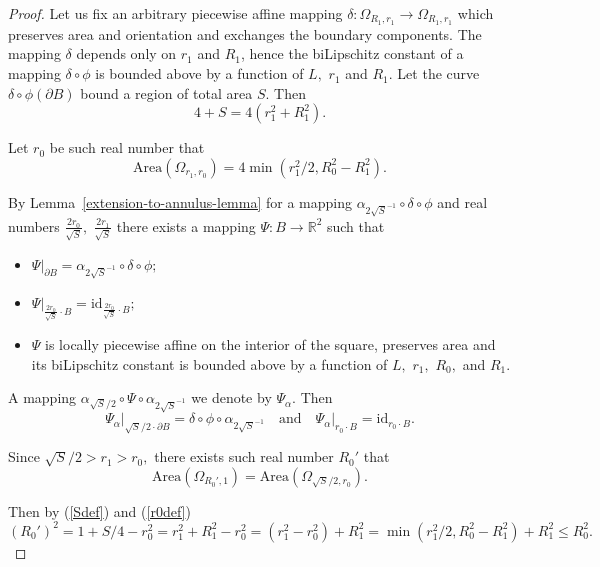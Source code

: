 \documentclass[12pt]{article}
\theoremstyle{definition}
\begin{document}
\begin{proof}
Let us fix an arbitrary piecewise affine mapping $\delta: \Omega_{R_1,r_1} \to \Omega_{R_1,r_1}$ which preserves area and orientation and exchanges the boundary components. The mapping $\delta$ depends only on $r_1$ and $R_1$, hence the biLipschitz constant of a mapping $\delta\circ\phi$ is bounded above by a function of $L,$ $r_1$ and $R_1.$ Let the curve $\delta\circ\phi(\partial B)$ bound a region of total area $S$. Then
\begin{equation}
\label{Sdef}
4 + S = 4\left(r_1^2 + R_1^2\right).
\end{equation}

Let $r_0$ be such real number that
\begin{equation}
\label{r0def}
\mathrm{Area}(\Omega_{r_1,r_0}) = 4\min\left(r_1^2/2, R_0^2 - R_1^2\right).
\end{equation}

By Lemma~\ref{extension-to-annulus-lemma} for a mapping $\alpha_{2\sqrt{S}^{-1}}\circ\delta\circ\phi$ and real numbers $\frac{2r_0}{\sqrt{S}},$ $\frac{2r_1}{\sqrt{S}}$ there exists a mapping $\Psi: B\to\mathbb R^2$ such that
\begin{itemize}
\item $\Psi\big|_{\partial B} = \alpha_{2\sqrt{S}^{-1}}\circ\delta\circ\phi;$
\item $\Psi\big|_{\frac{2r_0}{\sqrt{S}}\cdot B} = \mathrm{id}_{\frac{2r_0}{\sqrt{S}}\cdot B};$
\item $\Psi$ is locally piecewise affine on the interior of the square, preserves area and its biLipschitz constant is bounded above by a function of $L,$ $r_1,$ $R_0,$ and $R_1.$
\end{itemize}

A mapping $\alpha_{\sqrt{S}/2}\circ\Psi\circ\alpha_{2\sqrt{S}^{-1}}$ we denote by $\Psi_{\alpha}.$ Then
$$\Psi_{\alpha}\big|_{\sqrt{S}/2\cdot\partial B} = \delta\circ\phi\circ\alpha_{2\sqrt{S}^{-1}}
\quad\text{and}\quad
\Psi_{\alpha}\big|_{r_0\cdot B} = \mathrm{id}_{r_0\cdot B}.
$$

Since $\sqrt{S}/2 > r_1 > r_0,$ there exists such real number $R_0'$ that
$$\mathrm{Area}(\Omega_{R_0', 1}) = \mathrm{Area}(\Omega_{\sqrt {S}/2, r_0}).$$

Then by (\ref{Sdef}) and (\ref{r0def})
\begin{equation}
\label{R0prime}
\left(R_0'\right)^2 = 1 + S/4 - r_0^2 = r_1^2 + R_1^2 - r_0^2 = \left(r_1^2 -r_0^2\right) + R_1^2 = \min\left(r_1^2/2, R_0^2 - R_1^2\right) + R_1^2 \le R_0^2.
\end{equation}


\end{proof}
\end{document}
